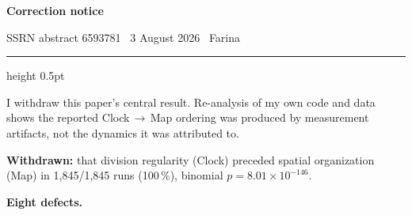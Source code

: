 \documentclass[11pt,letterpaper]{article}
\begin{document}
\clearpage

{\large\bfseries Correction notice}

\vspace{2pt}
{\small SSRN abstract 6593781 \textperiodcentered\ 3 August 2026
\textperiodcentered\ Farina}
\vspace{4pt}
{\color{rule}\hrule height 0.5pt}

I withdraw this paper's central result. Re-analysis of my own code and
data shows the reported Clock\,$\rightarrow$\,Map ordering was produced
by measurement artifacts, not the dynamics it was attributed to.

\textbf{Withdrawn:} that division regularity (Clock) preceded spatial
organization (Map) in 1{,}845/1{,}845 runs (100\,\%), binomial
$p = 8.01 \times 10^{-146}$.

\textbf{Eight defects.}
\end{document}
